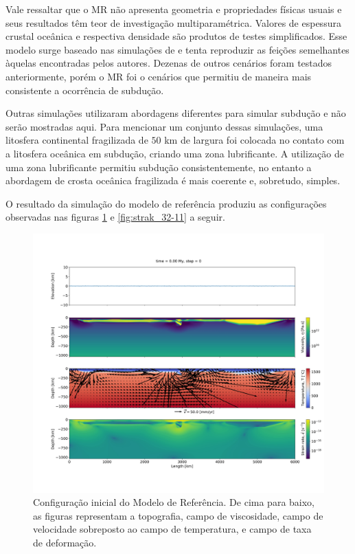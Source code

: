  

Vale ressaltar que o MR não apresenta geometria e propriedades físicas usuais e seus resultados têm teor de investigação multiparamétrica. Valores de espessura crustal oceânica e respectiva densidade são produtos de testes simplificados. Esse modelo surge baseado nas simulações de \citet{strak2021thermo} e tenta reproduzir as feições semelhantes àquelas encontradas pelos autores. Dezenas de outros cenários foram testados anteriormente, porém o MR foi o cenários que permitiu de maneira mais consistente a ocorrência de subdução. 

Outras simulações utilizaram abordagens diferentes para simular subdução e não serão mostradas aqui. Para mencionar um conjunto dessas simulações, uma litosfera continental fragilizada de $50$ km de largura foi colocada no contato com a litosfera oceânica em subdução, criando uma zona lubrificante. A utilização de uma zona lubrificante permitiu subdução consistentemente, no entanto a abordagem de crosta oceânica fragilizada é mais coerente e, sobretudo, simples.

O resultado da simulação do modelo de referência produziu as configurações observadas nas figuras \ref{fig:strak_32-00} e \ref{fig:strak_32-11} a seguir.

\begin{figure}
    \centering
    \includegraphics[trim={5cm 14cm 2cm 12cm}, clip, width=1.0 \textwidth]{fig/strak_32-00.png}
    \caption{Configuração inicial do Modelo de Referência. De cima para baixo, as figuras representam a topografia, campo de viscosidade, campo de velocidade sobreposto ao campo de temperatura, e campo de taxa de deformação.}
    \label{fig:strak_32-00}
\end{figure}

